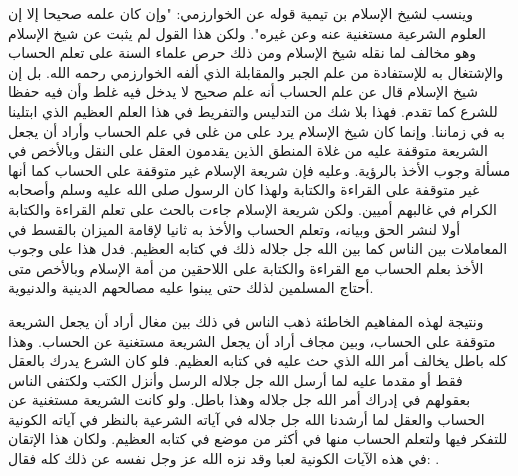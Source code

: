 وينسب لشيخ الإسلام بن تيمية قوله عن الخوارزمي: "وإن كان علمه صحيحا إلا إن العلوم الشرعية مستغنية عنه وعن غيره". ولكن هذا القول لم يثبت عن شيخ الإسلام وهو مخالف لما نقله شيخ الإسلام ومن ذلك حرص علماء السنة على تعلم الحساب والإشتغال به للإستفادة من علم الجبر والمقابلة الذي ألفه الخوارزمي رحمه الله. بل إن شيخ الإسلام قال عن علم الحساب أنه علم صحيح لا يدخل فيه غلط وأن فيه حفظا للشرع كما تقدم. فهذا بلا شك من التدليس والتفريط في هذا العلم العظيم الذي ابتلينا به في زماننا. وإنما كان شيخ الإسلام يرد على من غلى في علم الحساب وأراد أن يجعل الشريعة متوقفة عليه من غلاة المنطق الذين يقدمون العقل على النقل وبالأخص في مسألة وجوب الأخذ بالرؤية. وعليه فإن شريعة الإسلام غير متوقفة على الحساب كما أنها غير متوقفة على القراءة والكتابة ولهذا كان الرسول صلى الله عليه وسلم وأصحابه الكرام في غالبهم أميين. ولكن شريعة الإسلام جاءت بالحث على تعلم القراءة والكتابة أولا لنشر الحق وبيانه، وتعلم الحساب والأخذ به ثانيا لإقامة الميزان بالقسط في المعاملات بين الناس كما بين الله جل جلاله ذلك في كتابه العظيم. فدل هذا على وجوب الأخذ بعلم الحساب مع القراءة والكتابة على اللاحقين من أمة الإسلام وبالأخص متى أحتاج المسلمين لذلك حتى يبنوا عليه مصالحهم الدينية والدنيوية.

ونتيجة لهذه المفاهيم الخاطئة ذهب الناس في ذلك بين مغال أراد أن يجعل الشريعة متوقفة على الحساب، وبين مجاف أراد أن يجعل الشريعة مستغنية عن الحساب. وهذا كله باطل يخالف أمر الله الذي حث عليه في كتابه العظيم. فلو كان الشرع يدرك بالعقل فقط أو مقدما عليه لما أرسل الله جل جلاله الرسل وأنزل الكتب ولكتفى الناس بعقولهم في إدراك أمر الله جل جلاله وهذا باطل. ولو كانت الشريعة مستغنية عن الحساب والعقل لما أرشدنا الله جل جلاله في آياته الشرعية بالنظر في آياته الكونية للتفكر فيها ولتعلم الحساب منها في أكثر من موضع في كتابه العظيم. ولكان هذا الإتقان في هذه الآيات الكونية لعبا وقد نزه الله عز وجل نفسه عن ذلك كله فقال: \quranayah*[44][38-39] {\footnotesize (\surahname*[44])}.

